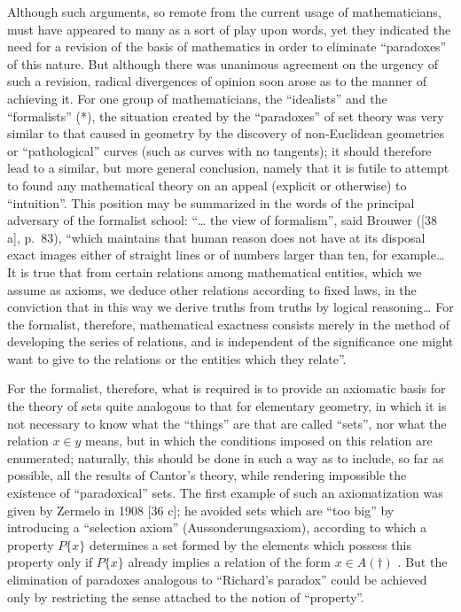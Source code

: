 Although such arguments, so remote from the current usage of mathematicians, must have appeared to many as a sort of play upon words, yet they indicated the need for a revision of the basis of mathematics in order to eliminate ``paradoxes'' of this nature. But although there was unanimous agreement on the urgency of such a revision, radical divergences of opinion soon arose as to the manner of achieving it. For one group of mathematicians, the ``idealists'' and the ``formalists'' (*), the situation created by the ``paradoxes'' of set theory was very similar to that caused in geometry by the discovery of non-Euclidean geometries or ``pathological'' curves (such as curves with no tangents); it should therefore lead to a similar, but more general conclusion, namely that it is futile to attempt to found any mathematical theory on an appeal (explicit or otherwise) to ``intuition''. This position may be summarized in the words of the principal adversary of the formalist school: ``\ldots{} the view of formalism'', said Brouwer ({[}38 a{]}, p.~83), ``which maintains that human reason does not have at its disposal exact images either of straight lines or of numbers larger than ten, for example\ldots{} It is true that from certain relations among mathematical entities, which we assume as axioms, we deduce other relations according to fixed laws, in the conviction that in this way we derive truths from truths by logical reasoning\ldots{} For the formalist, therefore, mathematical exactness consists merely in the method of developing the series of relations, and is independent of the significance one might want to give to the relations or the entities which they relate''.

For the formalist, therefore, what is required is to provide an axiomatic basis for the theory of sets quite analogous to that for elementary geometry, in which it is not necessary to know what the ``things'' are that are called ``sets'', nor what the relation \(x \in y\) means, but in which the conditions imposed on this relation are enumerated; naturally, this should be done in such a way as to include, so far as possible, all the results of Cantor's theory, while rendering impossible the existence of ``paradoxical'' sets. The first example of such an axiomatization was given by Zermelo in 1908 {[}36 c{]}; he avoided sets which are ``too big'' by introducing a ``selection axiom'' (Aussonderungsaxiom), according to which a property \(P\{x\}\) determines a set formed by the elements which possess this property only if \(P\{x\}\) already implies a relation of the form \(x \in A (\dagger)\) . But the elimination of paradoxes analogous to ``Richard's paradox'' could be achieved only by restricting the sense attached to the notion of ``property''.

